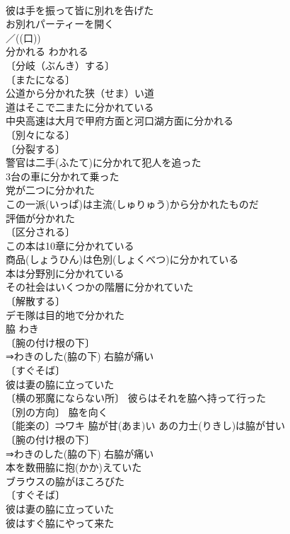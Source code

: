 \documentclass[8pt]{extreport}
\begin{document}
\begin{CJK}{UTF8}{min}
\\	彼は手を振って皆に別れを告げた 
\\	お別れパーティーを開く 
\\	／((口)) 
\\	分かれる	わかれる	
\\	〔分岐（ぶんき）する〕
\\	〔またになる〕
\\	公道から分かれた狭（せま）い道 
\\	道はそこで二またに分かれている 
\\	中央高速は大月で甲府方面と河口湖方面に分かれる 
\\	〔別々になる〕
\\	〔分裂する〕
\\	警官は二手(ふたて)に分かれて犯人を追った 
\\	3台の車に分かれて乗った 
\\	党が二つに分かれた 
\\	この一派(いっぱ)は主流(しゅりゅう)から分かれたものだ 
\\	評価が分かれた 
\\	〔区分される〕
\\	この本は10章に分かれている 
\\	商品(しょうひん)は色別(しょくべつ)に分かれている 
\\	本は分野別に分かれている 
\\	その社会はいくつかの階層に分かれていた 
\\	〔解散する〕
\\	デモ隊は目的地で分かれた 
\\	脇	わき	
\\	〔腕の付け根の下〕
\\	⇒わきのした(脇の下) 右脇が痛い 
\\	〔すぐそば〕 
\\	彼は妻の脇に立っていた 
\\	〔横の邪魔にならない所〕 彼らはそれを脇へ持って行った 
\\	〔別の方向〕 脇を向く 
\\	〔能楽の〕⇒ワキ 脇が甘(あま)い あの力士(りきし)は脇が甘い 
\\	〔腕の付け根の下〕
\\	⇒わきのした(脇の下) 右脇が痛い 
\\	本を数冊脇に抱(かか)えていた 
\\	ブラウスの脇がほころびた 
\\	〔すぐそば〕 
\\	彼は妻の脇に立っていた 
\\	彼はすぐ脇にやって来た 

\end{CJK}
\end{document}
